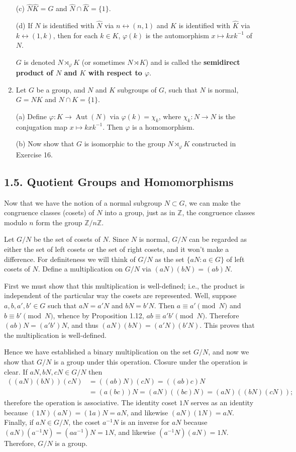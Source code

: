 \documentclass[leqno]{book}
\begin{document}
\begin{enumerate}
(c) $\widehat N\widehat K=G$ and $\widehat N\cap\widehat K=\{1\}$.

(d) If $N$ is identified with $\widehat N$ via $n\leftrightarrow(n,1)$ and $K$ is identified with $\widehat K$ via $k\leftrightarrow(1,k)$, then for each $k\in K$, $\varphi(k)$ is the automorphism $x\mapsto kxk^{-1}$ of $N$.

$G$ is denoted $N\rtimes_\varphi K$ (or sometimes $N\rtimes K$) and is called the \textbf{semidirect product of $N$ and $K$ with respect to $\varphi$}.

\item Let $G$ be a group, and $N$ and $K$ subgroups of $G$, such that $N$ is normal, $G=NK$ and $N\cap K=\{1\}$.

(a) Define $\varphi:K\to\operatorname{Aut}(N)$ via $\varphi(k)=\chi_k$, where $\chi_k:N\to N$ is the conjugation map $x\mapsto kxk^{-1}$.  Then $\varphi$ is a homomorphism.

(b) Now show that $G$ is isomorphic to the group $N\rtimes_\varphi K$ constructed in Exercise 16.
\end{enumerate}

\subsection*{1.5. Quotient Groups and Homomorphisms}
Now that we have the notion of a normal subgroup $N\subset G$, we can make the congruence classes (cosets) of $N$ into a group, just as in $\mathbb Z$, the congruence classes modulo $n$ form the group $\mathbb Z/n\mathbb Z$.

Let $G/N$ be the set of cosets of $N$.  Since $N$ is normal, $G/N$ can be regarded as either the set of left cosets or the set of right cosets, and it won't make a difference.  For definiteness we will think of $G/N$ as the set $\{aN:a\in G\}$ of left cosets of $N$.  Define a multiplication on $G/N$ via $(aN)(bN)=(ab)N$.

First we must show that this multiplication is well-defined; i.e., the product is independent of the particular way the cosets are represented.  Well, suppose $a,b,a',b'\in G$ such that $aN=a'N$ and $bN=b'N$.  Then $a\equiv a'\pmod N$ and $b\equiv b'\pmod N$, whence by Proposition 1.12, $ab\equiv a'b'\pmod N$.  Therefore $(ab)N=(a'b')N$, and thus $(aN)(bN)=(a'N)(b'N)$.  This proves that the multiplication is well-defined.

Hence we have established a binary multiplication on the set $G/N$, and now we show that $G/N$ is a group under this operation.  Closure under the operation is clear.  If $aN,bN,cN\in G/N$ then
\begin{align*}
((aN)(bN))(cN)&=((ab)N)(cN)=((ab)c)N\\&=(a(bc))N=(aN)((bc)N)=(aN)((bN)(cN));
\end{align*}
therefore the operation is associative.  The identity coset $1N$ serves as an identity because $(1N)(aN)=(1a)N=aN$, and likewise $(aN)(1N)=aN$.  Finally, if $aN\in G/N$, the coset $a^{-1}N$ is an inverse for $aN$ because $(aN)(a^{-1}N)=(aa^{-1})N=1N$, and likewise $(a^{-1}N)(aN)=1N$.  Therefore, $G/N$ is a group.
\end{document}
